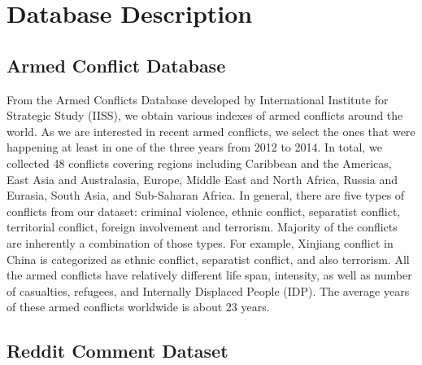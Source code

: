 \section{Database Description}
\subsection{Armed Conflict Database}
From the Armed Conflicts Database developed by International Institute for Strategic Study (IISS), we obtain various indexes of armed conflicts around the world. As we are interested in recent armed conflicts, we select the ones that were happening at least in one of the three years from 2012 to 2014. In total, we collected 48 conflicts covering regions including Caribbean and the Americas, East Asia and Australasia, Europe, Middle East and North Africa, Russia and Eurasia, South Asia, and Sub-Saharan Africa. In general, there are five types of conflicts from our dataset: criminal violence, ethnic conflict, separatist conflict, territorial conflict, foreign involvement and terrorism. Majority of the conflicts are inherently a combination of those types. For example, Xinjiang conflict in China is categorized as ethnic conflict, separatist conflict, and also terrorism. All the armed conflicts have relatively different life span, intensity, as well as number of casualties, refugees, and Internally Displaced People (IDP). The average years of these armed conflicts worldwide is about 23 years.

\subsection{Reddit Comment Dataset}
